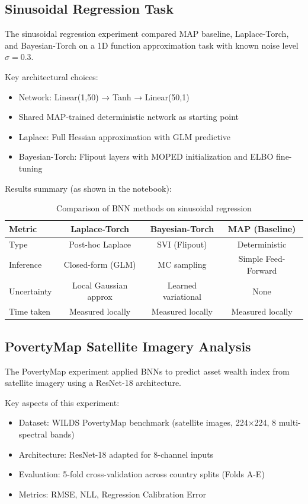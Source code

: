 \documentclass[11pt]{article}
\begin{document}
\subsection{Sinusoidal Regression Task}

The sinusoidal regression experiment compared MAP baseline, Laplace-Torch, and Bayesian-Torch on a 1D function approximation task with known noise level $\sigma=0.3$.

Key architectural choices:
\begin{itemize}
    \item Network: Linear(1,50) → Tanh → Linear(50,1)
    \item Shared MAP-trained deterministic network as starting point
    \item Laplace: Full Hessian approximation with GLM predictive
    \item Bayesian-Torch: Flipout layers with MOPED initialization and ELBO fine-tuning
\end{itemize}

Results summary (as shown in the notebook):
\begin{table}[htbp]
\centering
\caption{Comparison of BNN methods on sinusoidal regression}
\begin{tabular}{lccc}
\toprule
\textbf{Metric} & \textbf{Laplace-Torch} & \textbf{Bayesian-Torch} & \textbf{MAP (Baseline)} \\
\midrule
Type & Post-hoc Laplace & SVI (Flipout) & Deterministic \\
Inference & Closed-form (GLM) & MC sampling & Simple Feed-Forward \\
Uncertainty & Local Gaussian approx & Learned variational & None \\
Time taken & Measured locally & Measured locally & Measured locally \\
\bottomrule
\end{tabular}
\end{table}

\subsection{PovertyMap Satellite Imagery Analysis}

The PovertyMap experiment applied BNNs to predict asset wealth index from satellite imagery using a ResNet-18 architecture.

Key aspects of this experiment:
\begin{itemize}
    \item Dataset: WILDS PovertyMap benchmark (satellite images, 224×224, 8 multi-spectral bands)
    \item Architecture: ResNet-18 adapted for 8-channel inputs
    \item Evaluation: 5-fold cross-validation across country splits (Folds A-E)
    \item Metrics: RMSE, NLL, Regression Calibration Error
\end{itemize}
\end{document}
